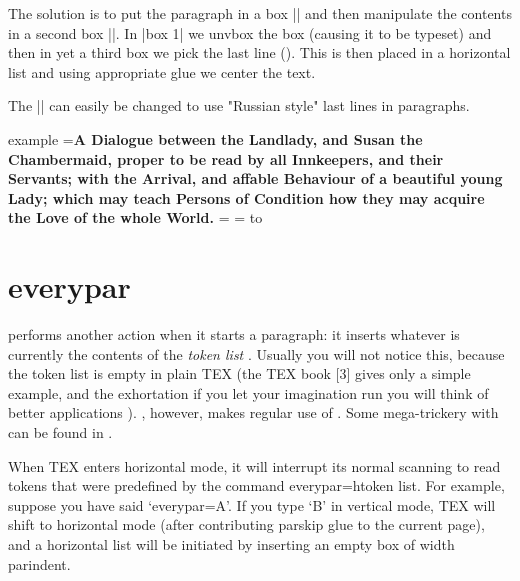 \begin{teXXX}
\def\weirdtitle#1{%
       \bgroup
       \setbox0=\vbox{\bf\noindent #1}%
       \setbox1=\vbox{%
            \unvbox0
            \setbox2=\lastbox
            \hbox to \linewidth{\hfill\unhbox2 \hfill}%
       }%
       \unvbox1
      \egroup
  }%
\end{teXXX}

The solution is to put the paragraph in a box || and then manipulate the contents in a second box ||. In |box 1| we unvbox the box (causing it to be typeset) and then in yet a third box we pick the last line (\cmd{\lastbox}). This is then placed in a horizontal list and using appropriate glue we center the text. 

\def\weirdtitlei#1{%
       \bgroup
       \setbox0=\vbox{\bf\noindent #1}%
       \setbox1=\vbox{%
            \unvbox0
            \setbox2=\lastbox
            \hbox to \linewidth{\hfill\unhbox2}%
       }%
       \unvbox1
      \egroup
  }%

The |\hbox| can easily be changed to use "Russian style" last lines in paragraphs.

\begin{scriptexample}{example}{}
\weirdtitlei{A Dialogue between the Landlady, and Susan the Chambermaid, proper to be
read by all Innkeepers, and their Servants; with the Arrival, and
affable Behaviour of a beautiful young Lady; which may teach Persons of
Condition how they may acquire the Love of the whole World.}
\end{scriptexample}

\section{everypar}

\tex performs another action when it starts a paragraph:
it inserts whatever is currently the contents of the \emph{token
list} . Usually you will not notice this, because
the token list is empty in plain TEX (the TEX book [3]
gives only a simple example, and the exhortation  if you
let your imagination run you will think of better applications ).
\latex, however, makes regular use of
. Some mega-trickery with 
can be found in \cite{Lamport1994}. 

When TEX enters horizontal mode, it will interrupt its normal scanning to read
tokens that were predefined by the command everypar={htoken list}. For
example, suppose you have said `everypar={A}'. If you type `B' in vertical mode, TEX
will shift to horizontal mode (after contributing parskip glue to the current page),
and a horizontal list will be initiated by inserting an empty box of width parindent.


